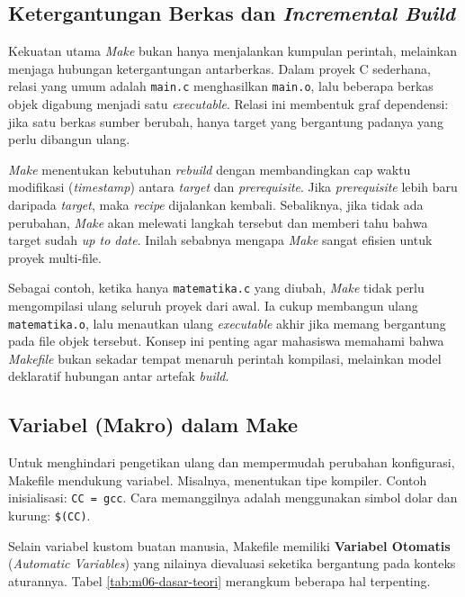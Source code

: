 \subsection{Ketergantungan Berkas dan \textit{Incremental Build}}
Kekuatan utama \textit{Make} bukan hanya menjalankan kumpulan perintah, melainkan menjaga hubungan ketergantungan antarberkas. Dalam proyek C sederhana, relasi yang umum adalah \texttt{main.c} menghasilkan \texttt{main.o}, lalu beberapa berkas objek digabung menjadi satu \textit{executable}. Relasi ini membentuk graf dependensi: jika satu berkas sumber berubah, hanya target yang bergantung padanya yang perlu dibangun ulang.

\textit{Make} menentukan kebutuhan \textit{rebuild} dengan membandingkan cap waktu modifikasi (\textit{timestamp}) antara \textit{target} dan \textit{prerequisite}. Jika \textit{prerequisite} lebih baru daripada \textit{target}, maka \textit{recipe} dijalankan kembali. Sebaliknya, jika tidak ada perubahan, \textit{Make} akan melewati langkah tersebut dan memberi tahu bahwa target sudah \textit{up to date}. Inilah sebabnya mengapa \textit{Make} sangat efisien untuk proyek multi-file.

Sebagai contoh, ketika hanya \texttt{matematika.c} yang diubah, \textit{Make} tidak perlu mengompilasi ulang seluruh proyek dari awal. Ia cukup membangun ulang \texttt{matematika.o}, lalu menautkan ulang \textit{executable} akhir jika memang bergantung pada file objek tersebut. Konsep ini penting agar mahasiswa memahami bahwa \textit{Makefile} bukan sekadar tempat menaruh perintah kompilasi, melainkan model deklaratif hubungan antar artefak \textit{build}.

\subsection{Variabel (Makro) dalam Make}
Untuk menghindari pengetikan ulang dan mempermudah perubahan konfigurasi, Makefile mendukung variabel. Misalnya, menentukan tipe kompiler.
Contoh inisialisasi: \texttt{CC = gcc}. Cara memanggilnya adalah menggunakan simbol dolar dan kurung: \texttt{\$(CC)}.

Selain variabel kustom buatan manusia, Makefile memiliki \textbf{Variabel Otomatis} (\textit{Automatic Variables}) yang nilainya dievaluasi seketika bergantung pada konteks aturannya. Tabel \ref{tab:m06-dasar-teori} merangkum beberapa hal terpenting.

